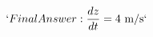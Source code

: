 \documentclass[preview]{standalone}
\begin{document}
\begin{align*}
`Final Answer: \frac{dz}{dt} = 4 \text{ m/s}`
\end{align*}
\end{document}

